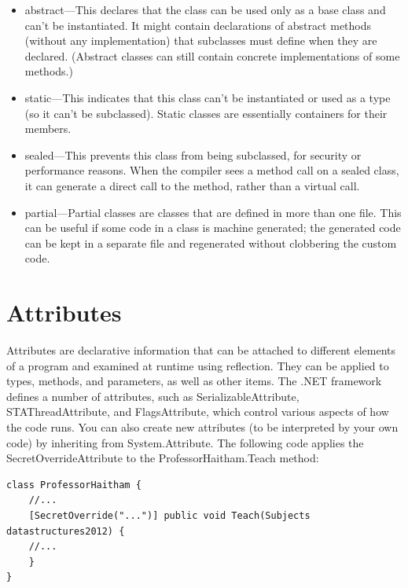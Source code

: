 \documentclass[12pt,a4paper,final,twoside,titlepage]{book}
\begin{document}
\begin{itemize}
\item abstract—This declares that the class can be used only as a base class and can’t be instantiated. It might contain declarations of abstract methods (without any implementation) that subclasses must define when they are declared. (Abstract classes can still contain concrete implementations of some methods.)
\item static—This indicates that this class can’t be instantiated or used as a type (so it can’t be subclassed). Static classes are essentially containers for their members.
\item sealed—This prevents this class from being subclassed, for security or performance reasons. When the compiler sees a method call on a sealed class, it can generate a direct call to the method, rather than a virtual call.
\item partial—Partial classes are classes that are defined in more than one file. This can be useful if some code in a class is machine generated; the generated code can be kept in a separate file and regenerated without clobbering the custom code.
\end{itemize}
\section{Attributes}
Attributes are declarative information that can be attached to different elements of a program and examined at runtime using reflection. They can be applied to types, methods, and parameters, as well as other items. The .NET framework defines a number of attributes, such as SerializableAttribute, STAThreadAttribute, and FlagsAttribute, which control various aspects of how the code runs. You can also create new attributes (to be interpreted by your own code) by inheriting from System.Attribute.
The following code applies the SecretOverrideAttribute to the ProfessorHaitham.Teach method:
\lstset{language=csh, tabsize=4}
\begin{center}
 \begin{lstlisting}
class ProfessorHaitham { 
	//...
	[SecretOverride("...")] public void Teach(Subjects datastructures2012) {
	//...
	}
}
 \end{lstlisting}
\end{center}
\end{document}
